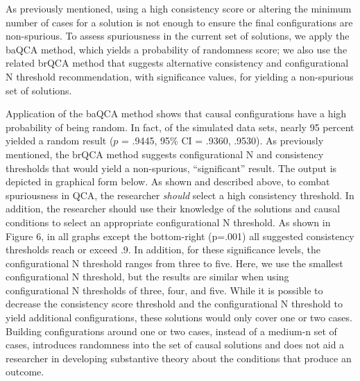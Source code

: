 \documentclass[12pt]{article}
\begin{document}
{{{{As previously mentioned, using a high consistency score or altering the minimum number of cases for a solution is not enough to ensure the final configurations are non-spurious. To assess spuriousness in the current set of solutions, we apply the baQCA method, which yields a probability of randomness score; we also use the related brQCA method that suggests alternative consistency and configurational N threshold recommendation, with significance values, for yielding a non-spurious set of solutions. 

Application of the baQCA method shows that causal configurations have a high probability of being random. In fact, of the simulated data sets, nearly 95 percent yielded a random result ($p$ = .9445, 95\% CI = .9360, .9530). As previously mentioned, the brQCA method suggests configurational N and consistency thresholds that would yield a non-spurious, ``significant'' result. The output is depicted in graphical form below. As shown and described above, to combat spuriousness in QCA, the researcher {\it{should}} select a high consistency threshold. In addition, the researcher should use their knowledge of the solutions and causal conditions to select an appropriate configurational N threshold. As shown in Figure 6, in all graphs except the bottom-right (p=.001) all suggested consistency thresholds reach or exceed .9. In addition, for these significance levels, the configurational N threshold ranges from three to five. Here, we use the smallest configurational N threshold, but the results are similar when using configurational N thresholds of three, four, and five. While it is possible to decrease the consistency score threshold and the configurational N threshold to yield additional configurations, these solutions would only cover one or two cases. Building configurations around one or two cases, instead of a medium-n set of cases, introduces randomness into the set of causal solutions and does not aid a researcher in developing substantive theory about the conditions that produce an outcome.

}}}}
\end{document}
